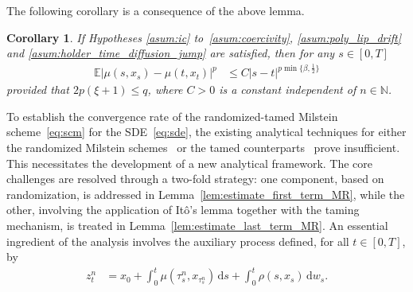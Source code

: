 \documentclass[reqno,  oneside, 12pt]{amsart}
\newtheorem{cor}{Corollary}[section]
\newcommand{\E}{\mathbb E}
\begin{document}

The  following corollary is a consequence of the above lemma.
\begin{cor} \label{cor:regularity_drift}
	If Hypotheses \mbox{\normalfont\ref{asum:ic}} to~\mbox{\normalfont\ref{asum:coercivity}}, \textnormal{\ref{asum:poly_lip_drift}} and \textnormal{\ref{asum:holder_time_diffusion_jump}} are satisfied, then for any   $s\in[0,T]$ 
	\begin{align*}
		\E|\mu(s,x_s)-\mu(t,x_t)|^{p}&\leq  C|s-t|^{p\min\{\beta,\frac{1}{2}\}}
	\end{align*}
	provided that $ 2 p{(\xi+1)}\leq {q}$,	where $C>0$    is a constant independent of  $n\in \mathbb N$. 
\end{cor}









To establish the convergence rate of the randomized-tamed Milstein scheme~\eqref{eq:scm} for the SDE~\eqref{eq:sde}, the existing analytical techniques for either the randomized Milstein schemes~\cite{Verena2024} or the tamed counterparts~\cite{Kumar2021a, Kumar2017} prove insufficient. This necessitates the development of a new analytical framework. The core challenges are resolved through a two-fold strategy: one component, based on randomization, is addressed in Lemma~\ref{lem:estimate_first_term_MR}, while the other, involving the application of It\^o's lemma together with the taming mechanism, is treated in Lemma~\ref{lem:estimate_last_term_MR}. An essential ingredient of the analysis involves the auxiliary process defined, for all \( t \in [0, T] \), by
\begin{align}
	z_t^n 
	&= x_0 
	+ \int_0^t \mu(\tau^n_s, x_{\tau^n_s})  \,\mathrm{d}s 
	+ \int_0^t \rho(s, x_s) \, \mathrm{d}w_s.
	\label{eq:auxiliary_equation}
\end{align}
\end{document}
